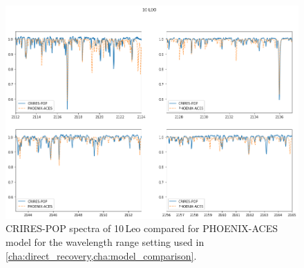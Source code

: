 \begin{figure}
    \centering
    \includegraphics[width=0.7\linewidth]{figures/atmos_and_models/CRIRES-POP-mismatch}
    \caption{CRIRES-POP spectra of {10\,Leo} compared for {PHOENIX-ACES} model for the wavelength range setting used in \cref{cha:direct_recovery,cha:model_comparison}.}
    \label{fig:crires-pop-mismatch}
\end{figure}
